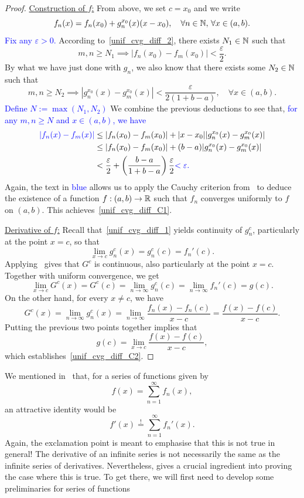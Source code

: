 \begin{proof}
	\ul{Construction of $f$:} From above, we set $c = x_0$ and we write
	\[
	f_n(x) = f_n(x_0) + g_n^{x_0}(x)(x-x_0),\quad \forall n\in\mathbb{N},\,\forall x\in(a,b).
	\]
	\textcolor{blue}{Fix any $\varepsilon>0$.} According to~\ref{unif_cvg_diff_2}, there exists $N_1\in\mathbb{N}$ such that
	\[
	m,n\ge N_1\implies |f_n(x_0) - f_m(x_0)|<\frac{\varepsilon}{2}.
	\]
	By what we have just done with $g_n$, we also know that there exists some $N_2\in\mathbb{N}$ such that
	\[
	m,n\ge N_2\implies |g_n^{x_0}(x) - g_m^{x_0}(x)|<\frac{\varepsilon}{2(1 + b-a)},\quad \forall x \in (a,b).
	\]
	\textcolor{blue}{Define $N:= \max(N_1,N_2)$} We combine the previous deductions to see that, \textcolor{blue}{for any $m,n\ge N$ and $x\in (a,b)$, we have}
	\begin{align*}
		\textcolor{blue}{|f_n(x) - f_m(x)|} &\le |f_n(x_0) - f_m(x_0)| + |x-x_0||g_n^{x_0}(x) - g_m^{x_0}(x)| 	\\
		&\le |f_n(x_0) - f_m(x_0)| + (b-a)|g_n^{x_0}(x) - g_m^{x_0}(x)| 	\\
		&< \frac{\varepsilon}{2} + \left(\frac{b-a}{1 + b-a}\right)\frac{\varepsilon}{2} \textcolor{blue}{< \varepsilon.}
	\end{align*}
	Again, the text in \textcolor{blue}{blue} allows us to apply the Cauchy criterion from~ to deduce the existence of a function $f:(a,b)\to \mathbb{R}$ such that $f_n$ converges uniformly to $f$ on $(a,b)$. This achieves~\ref{unif_cvg_diff_C1}.
	
	\ul{Derivative of $f$:} Recall that~\ref{unif_cvg_diff_1} yields continuity of $g_n^c$, particularly at the point $x=c$, so that
	\[
	\lim_{x\to c}g_n^c(x) = g_n^c(c) = f_n'(c).
	\]
	Applying~ gives that $G^c$ is continuous, also particularly at the point $x=c$. Together with uniform convergence, we get
	\[
	\lim_{x\to c}G^c(x) = G^c(c) = \lim_{n\to \infty}g_n^c(c) = \lim_{n\to \infty}f_n'(c) = g(c).
	\]
	On the other hand, for every $x\neq c$, we have
	\[
	G^c(x) = \lim_{n\to \infty}g_n^c(x) = \lim_{n\to \infty}\frac{f_n(x)-f_n(c)}{x-c} = \frac{f(x) - f(c)}{x-c}.
	\]
	Putting the previous two points together implies that
	\[
	g(c) = \lim_{x\to c}\frac{f(x)-f(c)}{x-c},
	\]
	which establishes~\ref{unif_cvg_diff_C2}.
\end{proof}
We mentioned in~ that, for a series of functions given by
\[
f(x) = \sum_{n=1}^\infty f_n(x),
\]
an attractive identity would be
\[
f'(x) \overset{!}{=} \sum_{n=1}^\infty f_n'(x).
\]
Again, the exclamation point is meant to emphasise that this is not true in general! The derivative of an infinite series is not necessarily the same as the infinite series of derivatives. Nevertheless,  gives a crucial ingredient into proving the case where this is true. To get there, we will first need to develop some preliminaries for series of functions